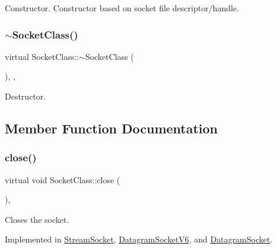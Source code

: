 Constructor. Constructor based on socket file descriptor/handle. \mbox{\label{classSocketClass_a14830bd93e1befaf276625e8b28181b9}} 
\subsubsection{\texorpdfstring{$\sim$\+Socket\+Class()}{~SocketClass()}}
{\footnotesize\ttfamily virtual Socket\+Class\+::$\sim$\+Socket\+Class (\begin{DoxyParamCaption}{ }\end{DoxyParamCaption})\hspace{0.3cm}{\ttfamily [inline]}, {\ttfamily [protected]}, {\ttfamily [virtual]}}



Destructor. 



\subsection{Member Function Documentation}
\mbox{\label{classSocketClass_a92c8c1b22b98f0231932cbd84cdc4cfe}} 
\subsubsection{\texorpdfstring{close()}{close()}}
{\footnotesize\ttfamily virtual void Socket\+Class\+::close (\begin{DoxyParamCaption}{ }\end{DoxyParamCaption})\hspace{0.3cm}{\ttfamily [protected]}, {}}

Closes the socket. \label{classSocketClass_close}%
%
 

Implemented in \hyperlink{classStreamSocket_a9dc930d6a0f7d6a8b96631348297bce2}{Stream\+Socket}, \hyperlink{classDatagramSocketV6_ad002933c38f60f789a5a425921d9ca4d}{Datagram\+Socket\+V6}, and \hyperlink{classDatagramSocket_a5c926c1d93a9e1b2e19d73170c4984cb}{Datagram\+Socket}.

\mbox{\label{classSocketClass_a4d4f7b6c50741127bc1ad82f43fc625c}} 
